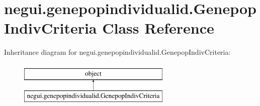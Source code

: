 \hypertarget{classnegui_1_1genepopindividualid_1_1GenepopIndivCriteria}{}\section{negui.\+genepopindividualid.\+Genepop\+Indiv\+Criteria Class Reference}
\label{classnegui_1_1genepopindividualid_1_1GenepopIndivCriteria}
Inheritance diagram for negui.\+genepopindividualid.\+Genepop\+Indiv\+Criteria\+:\begin{figure}[H]
\begin{center}
\leavevmode
\includegraphics[height=2.000000cm]{classnegui_1_1genepopindividualid_1_1GenepopIndivCriteria}
\end{center}
\end{figure}
